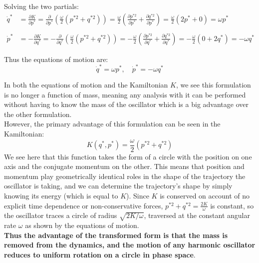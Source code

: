 \documentclass[titlepage]{article}
\begin{document}
Solving the two partials:
\begin{equation}
	\begin{split}
		\dot{q}^*&=\frac{\partial K}{\partial p^*}=\frac{\partial}{\partial p^*}\left(\frac{\omega}{2}\left(p^{*2}+q^{*2}\right)\right)=\frac{\omega}{2}\left(\frac{\partial p^{*2}}{\partial p^*}+\frac{\partial q^{*2}}{\partial p^*}\right)=\frac{\omega}{2}\left(2p^*+0\right)=\omega p^* \\
		\\
		\dot{p}^*&=-\frac{\partial K}{\partial q^*}=-\frac{\partial}{\partial q^*}\left(\frac{\omega}{2}\left(p^{*2}+q^{*2}\right)\right)=-\frac{\omega}{2}\left(\frac{\partial p^{*2}}{\partial q^*}+\frac{\partial q^{*2}}{\partial q^*}\right)=-\frac{\omega}{2}\left(0+2q^*\right)=-\omega q^*
	\end{split}
\end{equation}

\begin{mdframed}[linewidth=1pt, innertopmargin=10pt, innerbottommargin=10pt]
	Thus the equations of motion are:
	\begin{equation}
		\dot{q}^*=\omega p^*,\quad\dot{p}^*=-\omega q^*
	\end{equation}
	
	In both the equations of motion and the Kamiltonian $K$, we see this formulation is no longer a function of mass, meaning any analysis with it can be performed without having to know the mass of the oscillator which is a big advantage over the other formulation.\\
	
	However, the primary advantage of this formulation can be seen in the Kamiltonian:
	\begin{equation}
		K(q^*,p^*)=\frac{\omega}{2}\left(p^{*2}+q^{*2}\right)
	\end{equation}
	We see here that this function takes the form of a circle with the position on one axis and the conjugate momentum on the other. This means that position and momentum play geometrically identical roles in the shape of the trajectory the oscillator is taking, and we can determine the trajectory's shape by simply knowing its energy (which is equal to $K$). Since $K$ is conserved on account of no explicit time dependence or non-conservative forces, $p^{*2}+q^{*2}=\frac{2K}{\omega}$ is constant, so the oscillator traces a circle of radius $\sqrt{2K/\omega}$, traversed at the constant angular rate $\omega$ as shown by the equations of motion. \\
	
	\textbf{Thus the advantage of the transformed form is that the mass is removed from the dynamics, and the motion of any harmonic oscillator reduces to uniform rotation on a circle in phase space}.
\end{mdframed}
	
\end{document}

